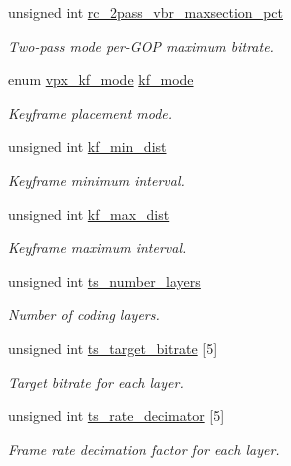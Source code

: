 \begin{DoxyCompactItemize}
unsigned int \hyperlink{structvpx__codec__enc__cfg_ab5212050b71b2d9f4dc663caa496949e}{rc\-\_\-2pass\-\_\-vbr\-\_\-maxsection\-\_\-pct}
\begin{DoxyCompactList}\small\item\em \-Two-\/pass mode per-\/\-G\-O\-P maximum bitrate. \end{DoxyCompactList}\item 
enum \hyperlink{group__encoder_ga9f461802aa4db35c04a8b23837987f40}{vpx\-\_\-kf\-\_\-mode} \hyperlink{structvpx__codec__enc__cfg_a491d67f061dcdb13f60c017563e9d788}{kf\-\_\-mode}
\begin{DoxyCompactList}\small\item\em \-Keyframe placement mode. \end{DoxyCompactList}\item 
unsigned int \hyperlink{structvpx__codec__enc__cfg_a0a7b5444ecb09745cbe8d5af17553846}{kf\-\_\-min\-\_\-dist}
\begin{DoxyCompactList}\small\item\em \-Keyframe minimum interval. \end{DoxyCompactList}\item 
unsigned int \hyperlink{structvpx__codec__enc__cfg_ae018440136e271743376730413d25a9b}{kf\-\_\-max\-\_\-dist}
\begin{DoxyCompactList}\small\item\em \-Keyframe maximum interval. \end{DoxyCompactList}\item 
unsigned int \hyperlink{structvpx__codec__enc__cfg_a16d4549a30cbd585e3c3056ef873d8c7}{ts\-\_\-number\-\_\-layers}
\begin{DoxyCompactList}\small\item\em \-Number of coding layers. \end{DoxyCompactList}\item 
unsigned int \hyperlink{structvpx__codec__enc__cfg_aba7ceb7a90500a8f76aff89575737f3a}{ts\-\_\-target\-\_\-bitrate} \mbox{[}5\mbox{]}
\begin{DoxyCompactList}\small\item\em \-Target bitrate for each layer. \end{DoxyCompactList}\item 
unsigned int \hyperlink{structvpx__codec__enc__cfg_ad40c30846ef8ef1d8684f10a491ec535}{ts\-\_\-rate\-\_\-decimator} \mbox{[}5\mbox{]}
\begin{DoxyCompactList}\small\item\em \-Frame rate decimation factor for each layer. \end{DoxyCompactList}\item 

\end{DoxyCompactItemize}
